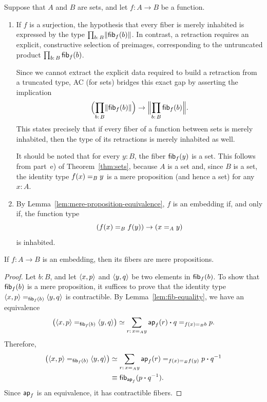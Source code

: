 \begin{rems} Suppose that $A$ and $B$ are sets, and let $f\colon A\to B$ be a function.
    \begin{enumerate}[-]
        \item If $f$ is a surjection, the hypothesis that every fiber is merely inhabited is expressed by the type $\prod_{b\colon B}\lVert\fun{fib}_f(b)\rVert$. In contrast, a retraction requires an explicit, constructive selection of preimages, corresponding to the untruncated product $\prod_{b\colon B}\fun{fib}_f(b)$.
    
        Since we cannot extract the explicit data required to build a retraction from a truncated type, AC (for sets) bridges this exact gap by asserting the implication
        \[
            \Bigl(
                \prod_{b\colon B}\lVert\fun{fib}_f(b)\rVert
            \Bigr)
            \to\Bigl\lVert
                \prod_{b\colon B}\fun{fib}_f(b)
            \Bigr\rVert.
        \]
        This states precisely that if every fiber of a function between sets is merely inhabited, then the type of its retractions is merely inhabited as well.
    
        It should be noted that for every $y\colon B$, the fiber $\mathsf{fib}_f(y)$ is a set. This follows from part~e) of Theorem~\ref{thm:sets}, because $A$ is a set and, since $B$ is a set, the identity type $f(x)\mathrel{=_{B}} y$ is a mere proposition (and hence a set) for any $x\colon A$.

        \item By Lemma~\ref{lem:mere-proposition-equivalence}, $f$ is an embedding if, and only if, the function type
        \[
            (f(x)\mathrel{=_{B}}f(y))\to(x\mathrel{=_{A}}y)
        \]
        is inhabited.
    \end{enumerate}
\end{rems}

\begin{lem}\label{lem:embedding-fibers-are-mere-propositions}
    If\/ $f\colon A\to B$ is an embedding, then its fibers are mere propositions. 
\end{lem}

\begin{proof}
    Let $b\colon B$, and let $\langle x,p\rangle$ and $\langle y,q\rangle$ be two elements in $\mathsf{fib}_f(b)$.
    To show that $\mathsf{fib}_f(b)$ is a mere proposition, it suffices to prove that the identity type $\langle x,p\rangle\mathrel{=_{\mathsf{fib}_f(b)}}\langle y,q\rangle$ is contractible.
    By Lemma~\ref{lem:fib-equality}, we have an equivalence
    \[
        \bigl(
            \dep{x,p}\eq{\fun{fib}_f(b)}\dep{y,q}
        \bigr)
        \simeq
        \sum_{r\colon x\eq Ay}
            \fun{ap}_f(r)\ct q\eq{f(x)\eq Bb}p.
    \]
    Therefore,
    \begin{align*}
        \bigl(
            \dep{x,p}\eq{\fun{fib}_f(b)}\dep{y,q}
        \bigr)
        &\simeq
        \sum_{r\colon x\eq Ay}
            \fun{ap}_f(r)\eq{f(x)\eq Bf(y)}p\ct q^{-1}\\
        &\equiv\fun{fib}_{\fun{ap}_f}(p\ct q^{-1}).
    \end{align*}    
    Since $\mathsf{ap}_f$ is an equivalence, it has contractible fibers.
    
\end{proof}

